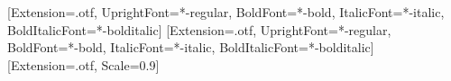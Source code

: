\setmainfont{texgyretermes}[Extension=.otf, UprightFont=*-regular, BoldFont=*-bold,
  ItalicFont=*-italic, BoldItalicFont=*-bolditalic]
\setsansfont{texgyreheros}[Extension=.otf, UprightFont=*-regular, BoldFont=*-bold,
  ItalicFont=*-italic, BoldItalicFont=*-bolditalic]
\setmonofont{lmmono10-regular}[Extension=.otf, Scale=0.9]
